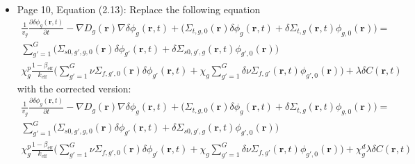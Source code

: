 \documentclass[12pt]{article}
\begin{document}
\begin{itemize}
    \item Page 10, Equation (2.13): Replace the  following equation
    \begin{equation*}
        \begin{aligned}
                \frac{1}{v_g} \frac{\partial \delta \phi_g (\textbf{r}, t)}{\partial t} - \nabla D_g(\textbf{r}) \nabla \delta \phi_g(\textbf{r}, t) + \biggl(\Sigma_{t,g,0}(\textbf{r}) \delta \phi_g(\textbf{r}, t) + \delta \Sigma_{t,g}(\textbf{r}, t) \phi_{g,0}(\textbf{r}) \biggr) = \\
                \sum_{g' = 1}^{G} \biggl(\Sigma_{s0,g',g,0}(\textbf{r}) \delta \phi_{g'}(\textbf{r}, t) + \delta \Sigma_{s0,g',g}(\textbf{r}, t) \phi_{g',0}(\textbf{r}) \biggr)\\
                \chi^p_g \frac{1-\beta_{\text{eff}}}{k_{\text{eff}}} \biggl(\sum_{g' = 1}^{G} \nu \Sigma_{f,g',0}(\textbf{r}) \delta \phi_{g'}(\textbf{r}, t) + \chi_g \sum_{g' = 1}^{G} \delta \nu \Sigma_{f,g'}(\textbf{r}, t) \phi_{g',0}(\textbf{r}) \biggr) + \lambda \delta C(\textbf{r}, t)
        \end{aligned}
    \end{equation*}
    with the corrected version:
\begin{equation*}
        \begin{aligned}
                \frac{1}{v_g} \frac{\partial \delta \phi_g (\textbf{r}, t)}{\partial t} - \nabla D_g(\textbf{r}) \nabla \delta \phi_g(\textbf{r}, t) + \biggl(\Sigma_{t,g,0}(\textbf{r}) \delta \phi_g(\textbf{r}, t) + \delta \Sigma_{t,g}(\textbf{r}, t) \phi_{g,0}(\textbf{r}) \biggr) = \\
                \sum_{g' = 1}^{G} \biggl(\Sigma_{s0,g',g,0}(\textbf{r}) \delta \phi_{g'}(\textbf{r}, t) + \delta \Sigma_{s0,g',g}(\textbf{r}, t) \phi_{g',0}(\textbf{r}) \biggr)\\
                \chi^p_g \frac{1-\beta_{\text{eff}}}{k_{\text{eff}}} \biggl(\sum_{g' = 1}^{G} \nu \Sigma_{f,g',0}(\textbf{r}) \delta \phi_{g'}(\textbf{r}, t) + \chi_g \sum_{g' = 1}^{G} \delta \nu \Sigma_{f,g'}(\textbf{r}, t) \phi_{g',0}(\textbf{r}) \biggr) + \chi^d_g \lambda \delta C(\textbf{r}, t)
        \end{aligned}
    \end{equation*}


\end{itemize}
\end{document}
